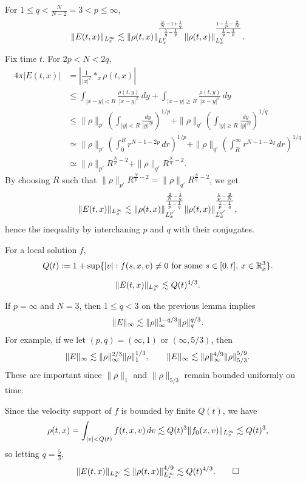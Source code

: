 \documentclass[11pt]{article}
\begin{document}
\begin{lem}
For $1\le q<\frac N{N-2}=3<p\le\infty$,
\[\|E(t,x)\|_{L_x^\infty}\lesssim\|\rho(t,x)\|_{L_x^p}^{\frac{\frac2N-1+\frac1q}{\frac1q-\frac1p}}\|\rho(t,x)\|_{L_x^q}^{\frac{1-\frac1p-\frac2N}{\frac1q-\frac1p}}.\]
\end{lem}
\begin{pf}
Fix time $t$.
For $2p<N<2q$,
\begin{align*}
4\pi|E(t,x)|
&=|\tfrac1{|x|^2}*_x\rho(t,x)|\\
&\le\int_{|x-y|<R}\frac{\rho(t,y)}{|x-y|^2}\,dy+\int_{|x-y|\ge R}\frac{\rho(t,y)}{|x-y|^2}\,dy\\
&\le\|\rho\|_{p'}(\int_{|y|<R}\frac{dy}{|y|^{2p}})^{1/p}+\|\rho\|_{q'}(\int_{|y|\ge R}\frac{dy}{|y|^{2q}})^{1/q}\\
&\simeq\|\rho\|_{p'}(\int_0^Rr^{N-1-2p}\,dr)^{1/p}+\|\rho\|_{q'}(\int_R^\infty r^{N-1-2q}\,dr)^{1/q}\\
&\simeq\|\rho\|_{p'}R^{\frac Np-2}+\|\rho\|_{q'}R^{\frac Nq-2}.
\end{align*}
By choosing $R$ such that $\|\rho\|_{p'}R^{\frac Np-2}=\|\rho\|_{q'}R^{\frac Nq-2}$, we get
\[\|E(t,x)\|_{L_x^\infty}\lesssim\|\rho(t,x)\|_{L_x^{p'}}^{\frac{\frac2N-\frac1q}{\frac1p-\frac1q}}\|\rho(t,x)\|_{L_x^{q'}}^{\frac{\frac1p-\frac2N}{\frac1p-\frac1q}},\]
hence the inequality by interchaning $p$ and $q$ with their conjugates.
\end{pf}


\begin{defn}
For a local solution $f$,
\[Q(t):=1+\sup\{|v|:f(s,x,v)\ne0\text{ for some }s\in[0,t],\,x\in\mathbb{R}_x^3\}.\]
\end{defn}
\begin{lem}
\[\|E(t,x)\|_{L_x^\infty}\lesssim Q(t)^{4/3}.\]
\end{lem}
\begin{pf}
If $p=\infty$ and $N=3$, then $1\le q<3$ on the previous lemma implies
\[\|E\|_\infty\lesssim\|\rho\|_\infty^{1-q/3}\|\rho\|_q^{q/3}.\]
For example, if we let $(p,q)=(\infty,1)$ or $(\infty,5/3)$, then
\[\|E\|_\infty\lesssim\|\rho\|_\infty^{2/3}\|\rho\|_1^{1/3},\qquad
\|E\|_\infty\lesssim\|\rho\|_\infty^{4/9}\|\rho\|_{5/3}^{5/9}.\]
These are important since $\|\rho\|_1$ and $\|\rho\|_{5/3}$ remain bounded uniformly on time.

Since the velocity support of $f$ is bounded by finite $Q(t)$, we have
\[\rho(t,x)=\int_{|v|<Q(t)}f(t,x,v)\,dv\lesssim Q(t)^3\|f_0(x,v)\|_{L_v^\infty}\lesssim Q(t)^3,\]
so letting $q=\frac53$,
\[\|E(t,x)\|_{L_x^\infty}\lesssim\|\rho(t,x)\|_{L_x^\infty}^{4/9}\lesssim Q(t)^{4/3}.\qedhere\]
\end{pf}
\end{document}
